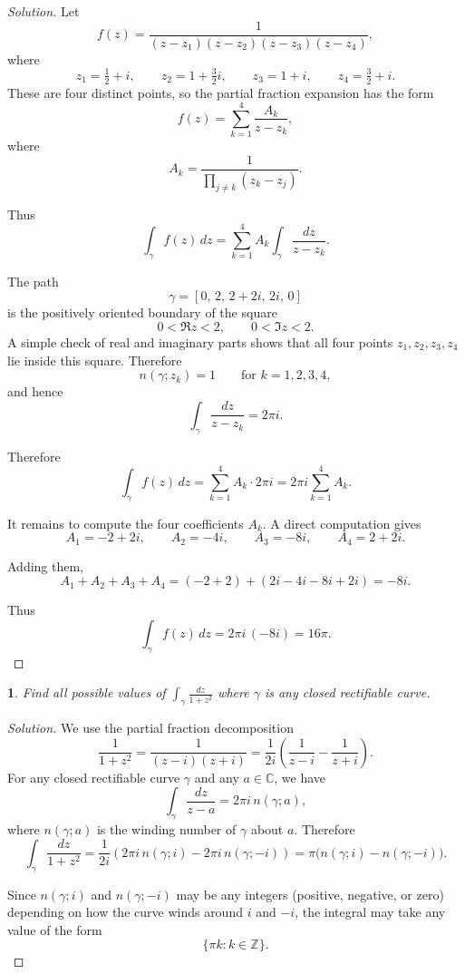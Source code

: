 \documentclass[12pt, a4paper]{report}
\theoremstyle{spaced}
\newtheorem{exercise}{}
\newcommand{\setexercise}[1]{\setcounter{exercise}{#1-1}}
\begin{document}
\begin{proof}[Solution]
	Let
	\[
		f(z)=\frac{1}{
			(z-z_1)(z-z_2)(z-z_3)(z-z_4)},
	\]
	where
	\[
		z_1=\tfrac12+i,\qquad
		z_2=1+\tfrac32 i,\qquad
		z_3=1+i,\qquad
		z_4=\tfrac32+i.
	\]
	These are four distinct points, so the partial fraction expansion has the form
	\[
		f(z)=
		\sum_{k=1}^4
		\frac{A_k}{z-z_k},
	\]
	where
	\[
		A_k=\frac{1}{
			\displaystyle \prod_{j\ne k}(z_k-z_j)}.
	\]

	Thus
	\[
		\int_\gamma f(z)\,dz
		=\sum_{k=1}^4 A_k
		\int_\gamma \frac{dz}{z-z_k}.
	\]

	The path
	\[
		\gamma=[0,\,2,\,2+2i,\,2i,\,0]
	\]
	is the positively oriented boundary of the square
	\[
		0<\Re z<2,\qquad 0<\Im z<2.
	\]
	A simple check of real and imaginary parts shows that all four points
	\(z_1,z_2,z_3,z_4\) lie inside this square.
	Therefore
	\[
		n(\gamma;z_k)=1
		\qquad\text{for }k=1,2,3,4,
	\]
	and hence
	\[
		\int_\gamma \frac{dz}{z-z_k}
		=2\pi i.
	\]

	Therefore
	\[
		\int_\gamma f(z)\,dz
		=\sum_{k=1}^4 A_k \cdot 2\pi i
		=
		2\pi i \sum_{k=1}^4 A_k.
	\]

	It remains to compute the four coefficients \(A_k\).  A direct computation gives
	\[
		A_1=-2+2i,\qquad
		A_2=-4i,\qquad
		A_3=-8i,\qquad
		A_4=2+2i.
	\]

	Adding them,
	\[
		A_1+A_2+A_3+A_4
		=(-2+2)+(2i-4i-8i+2i)
		=-8i.
	\]

	Thus
	\[
		\int_\gamma f(z)\,dz
		=2\pi i\,(-8i)
		=16\pi.
	\]
\end{proof}


\setexercise{10}
\begin{exercise}
	Find all possible values of $\displaystyle \int_{\gamma} \frac{dz}{1 + z^{2}}$ where $\gamma$ is any closed rectifiable curve.
\end{exercise}

\begin{proof}[Solution]
	We use the partial fraction decomposition
	\[
		\frac{1}{1+z^{2}}
		=\frac{1}{(z-i)(z+i)}
		=\frac{1}{2i}\left(\frac{1}{z-i}-\frac{1}{z+i}\right).
	\]
	For any closed rectifiable curve $\gamma$ and any $a\in\mathbb{C}$, we have
	\[
		\int_\gamma \frac{dz}{z-a}
		= 2\pi i\, n(\gamma;a),
	\]
	where $n(\gamma;a)$ is the winding number of $\gamma$ about $a$.
	Therefore
	\[
		\int_\gamma \frac{dz}{1+z^{2}}
		=\frac{1}{2i}
		\left(2\pi i\, n(\gamma;i) - 2\pi i\, n(\gamma;-i)\right)
		=\pi\bigl(n(\gamma;i)-n(\gamma;-i)\bigr).
	\]

	Since $n(\gamma;i)$ and $n(\gamma;-i)$ may be any integers (positive, negative, or zero)
	depending on how the curve winds around $i$ and $-i$, the integral may take any value of the form
	\[
		\{\pi k : k\in\mathbb{Z}\}.
	\]
\end{proof}
\end{document}
